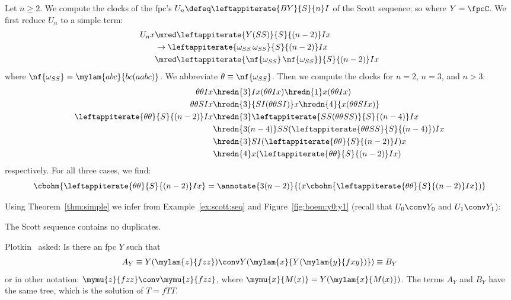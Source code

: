\begin{example}\label{ex:scott:seq}
  Let $n \geq 2$.
  We compute the clocks of the fpc's 
  $U_n \defeq \leftappiterate{BY}{S}{n} I$
  of the Scott sequence; so where $Y = \fpcC$.
  We first reduce $U_n$ to a simple term:
  \begin{align*}
    U_n x 
    & \mred \leftappiterate{Y (S S)}{S}{(n-2)} I x \\
    & \to \leftappiterate{\omega_{SS}\,\omega_{SS}}{S}{(n-2)} I x \\
    & \mred \leftappiterate{\nf{\omega_{SS}}\,\nf{\omega_{SS}}}{S}{(n-2)} I x
  \end{align*}
  where $\nf{\omega_{SS}} = \mylam{abc}{bc(aabc)}$.
  We abbreviate $\theta \equiv \nf{\omega_{SS}}$.
  Then we compute the clocks for $n = 2$, $n = 3$, and $n > 3$:
  \begin{align*}
    \theta\theta I x 
    & \hredn{3} I x (\theta\theta I x) 
    \hredn{1} x (\theta\theta I x) 
    \\
    \theta\theta S I x 
    & \hredn{3} {S I(\theta\theta S I)} x
    \hredn{4} {x (\theta\theta S I x)} 
    \\
    \leftappiterate{\theta\theta}{S}{(n-2)} I x
    &\hredn{3} \leftappiterate{ S S (\theta\theta S S)}{S}{(n-4)} I x
    \\
    &\hredn{3(n-4)} S S (\leftappiterate{ \theta \theta S S }{S}{(n-4)}) I x
    \\
    &\hredn{3} S I (\leftappiterate{ \theta \theta }{S}{(n-2)} I) x
    \\
    &\hredn{4} x (\leftappiterate{ \theta \theta }{S}{(n-2)} I x)
  \end{align*}
  respectively.
  For all three cases, we find: \[\cbohm{\leftappiterate{\theta\theta}{S}{(n-2)} I x} 
   = \annotate{3(n-2)}{(x \cbohm{\leftappiterate{ \theta \theta }{S}{(n-2)} I x})}\]
\end{example}
\noindent
Using Theorem~\ref{thm:simple} we infer from Example~\ref{ex:scott:seq}
and Figure~\ref{fig:boem:y0:y1} (recall that $U_0 \conv Y_0$ and $U_1 \conv Y_1$):
\begin{corollary}
  The Scott sequence contains no duplicates.  
\end{corollary}

Plotkin~\cite{plot:2007} asked:
Is there an fpc $Y$ such that
\begin{align*}
  A_Y \equiv Y(\mylam{z}{fzz}) \conv Y(\mylam{x}{Y(\mylam{y}{fxy})}) \equiv B_Y 
\end{align*}
or in other notation: $\mymu{z}{fzz} \conv \mymu{z}{fzz}$,
where 
$\mymu{x}{M(x)} = Y(\mylam{x}{M(x)})$.
The terms $A_Y$ and $B_Y$ have the same \boehm{} tree,
which is the solution of $T = f T T$.

